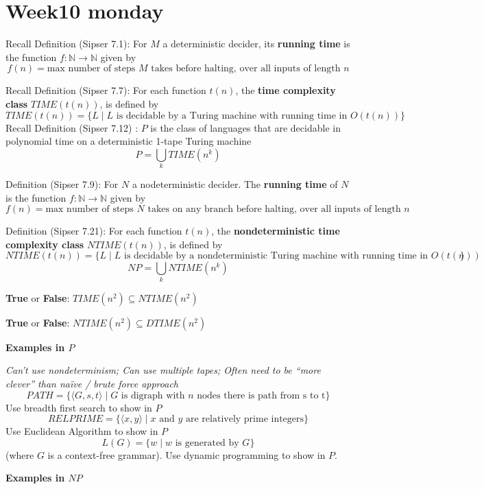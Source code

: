 \documentclass[12pt, oneside]{article}
\begin{document}
\section*{Week10 monday}


Recall Definition  (Sipser 7.1): For  $M$ a deterministic decider, its {\bf running time} is the function  $f: \mathbb{N} \to \mathbb{N}$
given  by
\[
f(n) =  \text{max number of  steps $M$ takes before halting, over all inputs  of length $n$}
\]

Recall Definition (Sipser 7.7): For each function $t(n)$, the {\bf time complexity class}  $TIME(t(n))$, is defined  by
\[
TIME( t(n)) = \{ L \mid \text{$L$ is decidable by  a Turing machine with running time in  $O(t(n))$} \}
\]
Recall Definition (Sipser 7.12) : $P$ is the class of languages that  are decidable in polynomial time on 
a deterministic 1-tape  Turing  machine
\[
P  =  \bigcup_k TIME(n^k)
\]

Definition (Sipser  7.9): For $N$ a nodeterministic decider.  
The {\bf running time} of $N$ is the function $f: \mathbb{N} \to \mathbb{N}$ given  by
\[
f(n) =  \text{max number of  steps $N$ takes on  any branch before halting, over all inputs  of length $n$}
\]

Definition (Sipser 7.21): For each function $t(n)$, the {\bf nondeterministic time complexity class}  
$NTIME(t(n))$, is defined  by
\[
NTIME( t(n)) = \{ L \mid \text{$L$ is decidable by a nondeterministic Turing machine with running time in $O(t(n))$} \}
\]
\[
NP = \bigcup_k NTIME(n^k)
\]


{\bf True} or {\bf False}: $TIME(n^2) \subseteq NTIME(n^2)$

\vfill

{\bf True} or {\bf False}: $NTIME(n^2) \subseteq DTIME(n^2)$

\vfill
\newpage

{\bf Examples in $P$ }

{\it Can't use nondeterminism; Can use multiple tapes; Often need to be “more clever” than naïve / brute force approach}
\[
    PATH = \{\langle G,s,t\rangle \mid \textrm{$G$ is digraph with $n$ nodes there is path from s to t}\}
\]
Use breadth first search to show in $P$
\[
    RELPRIME = \{ \langle x,y\rangle \mid \textrm{$x$ and $y$ are relatively prime integers}\}
\]
Use Euclidean Algorithm to show in $P$
\[
    L(G) = \{w \mid \textrm{$w$ is generated by $G$}\} 
\]
(where $G$ is a context-free grammar). Use dynamic programming to show in $P$.

\vfill
{\bf Examples in $NP$}
\end{document}
